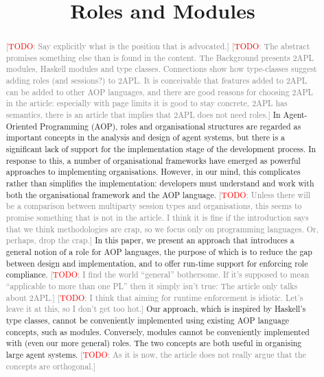 \documentclass[conference,compsoc]{IEEEtran} %
\title{Roles and Modules}
\author{
  \IEEEauthorblockN{Rem Collier and Claudia Grigore} 
  \IEEEauthorblockA{
    School of Computer Science and Informatics\\
    University College Dublin\\
    Belfield Campus, Dublin~4, Ireland\\
    Email: rem.collier@ucd.ie, claudia.grigore@ucdconnect.ie}}
\newcommand{\todo}[1]{{\small \textcolor{gray}{[\textcolor{red}{TODO}: #1]}}}
\begin{document}
\maketitle

\begin{abstract} %

\todo{Say explicitly what is the position that is advocated.}
\todo{The abstract promises something else than is found in the content.
The Background presents 2APL modules, Haskell modules and type classes.
Connections show how type-classes suggest adding roles (and sessions?) to
2APL. It is conceivable that features added to 2APL can be added to other
AOP languages, and there are good reasons for choosing 2APL in the article:
especially with page limits it is good to stay concrete, 2APL has
semantics, there is an article that implies that 2APL does not need roles.}
In Agent-Oriented Programming (AOP), roles and organisational structures
are regarded as important concepts in the analysis and design of agent
systems, but there is a significant lack of support for the implementation
stage of the development process. In response to this, a number of
organisational frameworks have emerged as powerful approaches to
implementing organisations. However, in our mind, this complicates rather
than simplifies the implementation: developers must understand and work
with both the organisational framework and the AOP language.
\todo{Unless there will be a comparison between multiparty session types
and organisations, this seems to promise something that is not in the
article. I think it is fine if the introduction says that we think
methodologies are crap, so we focus only on programming languages. Or,
perhaps, drop the crap.}
 In this paper,
we present an approach that introduces a general notion of a role for AOP
languages, the purpose of which is to reduce the gap between design and
implementation, and to offer run-time support for enforcing role
compliance. 
\todo{I find the world ``general'' bothersome. If it's supposed to mean
``applicable to more than one PL'' then it simply isn't true: The article
only talks about 2APL.} \todo{I think that aiming for runtime enforcement
is idiotic. Let's leave it at this, so I don't get too hot.}
Our approach, which is inspired by Haskell's type classes,
cannot be conveniently implemented using existing AOP language concepts,
such as modules. Conversely, modules cannot be conveniently implemented
with (even our more general) roles. The two concepts are both useful in
organising large agent systems.
\todo{As it is now, the article does not really argue that the concepts are
orthogonal.}

\end{abstract} %
\end{document}
